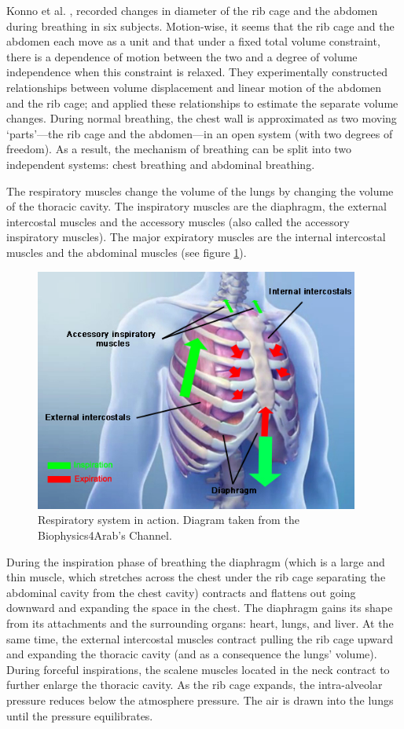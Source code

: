 Konno et al. \cite{konno1967measurement}, recorded changes in diameter of the rib cage and the abdomen during breathing in six subjects. Motion-wise, it seems that the rib cage and the abdomen each move as a unit and that under a fixed total volume constraint, there is a dependence of motion between the two and a degree of volume independence when this constraint is relaxed. They experimentally constructed relationships between volume displacement and linear motion of the abdomen and the rib cage; and applied these relationships to estimate the separate volume changes. During normal breathing, the chest wall is approximated as two moving `parts'---the rib cage and the abdomen---in an open system (with two degrees of freedom). As a result, the mechanism of breathing can be split into two independent systems: chest breathing and abdominal breathing.

The respiratory muscles change the volume of the lungs by changing the volume of the thoracic cavity. The inspiratory muscles are the diaphragm, the external intercostal muscles and the accessory muscles (also called the accessory inspiratory muscles). The major expiratory muscles are the internal intercostal muscles and the abdominal muscles (see figure \ref{fig:respiratory_schema}).

\begin{figure}
	\centering
	 \includegraphics[height=8cm]{pics/respiratory_schema}
	\caption[Respiratory system in action]{\label{fig:respiratory_schema}Respiratory system in action. Diagram taken from the Biophysics4Arab's Channel.}
\end{figure}

During the inspiration phase of breathing the diaphragm (which is a large and thin muscle, which stretches across the chest under the rib cage separating the abdominal cavity from the chest cavity) contracts and flattens out going downward and expanding the space in the chest. The diaphragm gains its shape from its attachments and the surrounding organs: heart, lungs, and liver. At the same time, the external intercostal muscles contract pulling the rib cage upward and expanding the thoracic cavity (and as a consequence the lungs' volume). During forceful inspirations, the scalene muscles located in the neck contract to further enlarge the thoracic cavity. As the rib cage expands, the intra-alveolar pressure reduces below the atmosphere pressure. The air is drawn into the lungs until the pressure equilibrates.

